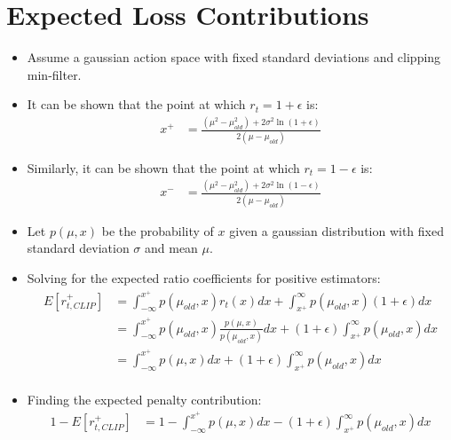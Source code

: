 \documentclass[a4paper]{article}
\begin{document}
\newpage
\section*{Expected Loss Contributions}
\begin{itemize}
    \item Assume a gaussian action space with fixed standard deviations and
        clipping min-filter.
    \item It can be shown that the point at which $r_t = 1 + \epsilon$ is:
    \begin{align*}
        x^{+} &=
        \frac{(\mu^2 - \mu_{old}^2)
            + 2\sigma^2\ln\left(1 + \epsilon\right)}
            {2(\mu - \mu_{old})}
    \end{align*}
    \item Similarly, it can be shown that the point at which $r_t = 1 -
        \epsilon$ is:
    \begin{align*}
        x^{-} &=
        \frac{(\mu^2 - \mu_{old}^2)
            + 2\sigma^2\ln\left(1 - \epsilon\right)}
            {2(\mu - \mu_{old})}
    \end{align*}
    \item Let $p(\mu, x)$ be the probability of $x$ given a gaussian
        distribution with fixed standard deviation $\sigma$ and mean $\mu$.
    \item Solving for the expected ratio coefficients for positive estimators:
    \begin{align*}
        E[r_{t, CLIP}^{+}] &= \int_{-\infty}^{x^{+}}p(\mu_{old}, x)r_{t}(x)dx +
                            \int_{x^{+}}^{\infty}p(\mu_{old}, x)(1 +
                            \epsilon)dx\\
        &= \int_{-\infty}^{x^{+}}
            p(\mu_{old}, x)
            \frac{p(\mu, x)}{p(\mu_{old}, x)}
            dx +
            (1 + \epsilon)
            \int_{x^{+}}^{\infty}p(\mu_{old}, x)dx\\
        &= \int_{-\infty}^{x^{+}}
            p(\mu, x)
            dx +
            (1 + \epsilon)
            \int_{x^{+}}^{\infty}p(\mu_{old}, x)dx\\
    \end{align*}
    \item Finding the expected penalty contribution:
    \begin{align*}
        1 - E[r_{t, CLIP}^+]
        &= 1 - \int_{-\infty}^{x^{+}}
            p(\mu, x)
            dx -
            (1 + \epsilon)
            \int_{x^{+}}^{\infty}p(\mu_{old}, x)dx\\

\end{align*}
\end{itemize}
\end{document}
